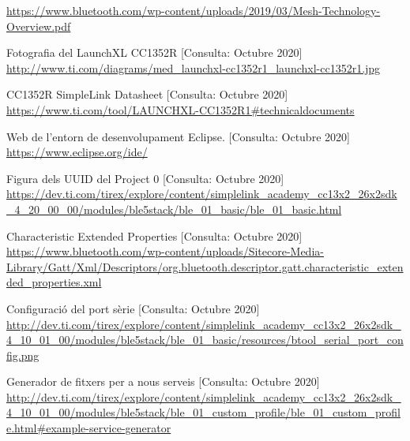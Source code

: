 \begin{thebibliography}{2}
\href{https://www.bluetooth.com/wp-content/uploads/2019/03/Mesh-Technology-Overview.pdf}{https://www.bluetooth.com/wp-content/uploads/2019/03/Mesh-Technology-Overview.pdf}

Fotografia del LaunchXL CC1352R
[Consulta: Octubre 2020]\newline
\href{http://www.ti.com/diagrams/med_launchxl-cc1352r1_launchxl-cc1352r1.jpg}{http://www.ti.com/diagrams/med\_launchxl-cc1352r1\_launchxl-cc1352r1.jpg}

CC1352R SimpleLink Datasheet
[Consulta: Octubre 2020]\newline
\href{https://www.ti.com/tool/LAUNCHXL-CC1352R1\#technicaldocuments}{https://www.ti.com/tool/LAUNCHXL-CC1352R1\#technicaldocuments}

Web de l'entorn de desenvolupament Eclipse.
[Consulta: Octubre 2020] \newline
\href{https://www.eclipse.org/ide/}{https://www.eclipse.org/ide/}

Figura dels UUID del Project 0 [Consulta: Octubre 2020]\newline
\href{https://dev.ti.com/tirex/explore/content/simplelink_academy_cc13x2_26x2sdk_4_20_00_00/modules/ble5stack/ble_01_basic/ble_01_basic.html}{https://dev.ti.com/tirex/explore/content/simplelink\_academy\_cc13x2\_26x2sdk\_4\_20\_00\_00/modules/ble5stack/ble\_01\_basic/ble\_01\_basic.html}


Characteristic Extended Properties
[Consulta: Octubre 2020]\newline
\href{https://www.bluetooth.com/wp-content/uploads/Sitecore-Media-Library/Gatt/Xml/Descriptors/org.bluetooth.descriptor.gatt.characteristic_extended_properties.xml}{https://www.bluetooth.com/wp-content/uploads/Sitecore-Media-Library/Gatt/Xml/Descriptors/org.bluetooth.descriptor.gatt.characteristic\_extended\_properties.xml}

Configuració del port sèrie
[Consulta: Octubre 2020] \newline
\href{http://dev.ti.com/tirex/explore/content/simplelink_academy_cc13x2_26x2sdk_4_10_01_00/modules/ble5stack/ble_01\_basic/resources/btool_serial_port_config.png}{http://dev.ti.com/tirex/explore/content/simplelink\_academy\_cc13x2\_26x2sdk\_4\_10\_01\_00/modules/ble5stack/ble\_01\_basic/resources/btool\_serial\_port\_config.png}

Generador de fitxers per a nous serveis 
[Consulta: Octubre 2020] \newline
\href{http://dev.ti.com/tirex/explore/content/simplelink\_academy\_cc13x2\_26x2sdk\_4\_10\_01\_00/modules/ble5stack/ble\_01\_custom\_profile/ble\_01\_custom\_profile.html\#example-service-generator}{http://dev.ti.com/tirex/explore/content/simplelink\_academy\_cc13x2\_26x2sdk\_4\_10\_01\_00/modules/ble5stack/ble\_01\_custom\_profile/ble\_01\_custom\_profile.html\#example-service-generator}


\end{thebibliography}
